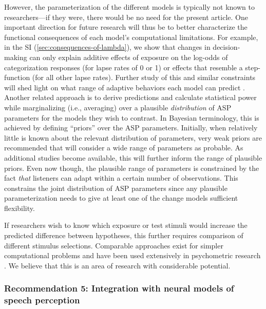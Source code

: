 \documentclass[
  11pt,
  man,floatsintext]{apa6}
\begin{document}
However, the parameterization of the different models is typically not known to researchers---if they were, there would be no need for the present article. One important direction for future research will thus be to better characterize the functional consequences of each model's computational limitations. For example, in the SI (\ref{sec:consequences-of-lambda}), we show that changes in decision-making can only explain additive effects of exposure on the log-odds of categorization responses (for lapse rates of 0 or 1) or effects that resemble a step-function (for all other lapse rates). Further study of this and similar constraints will shed light on what range of adaptive behaviors each model can predict \autocites[for discussions of global, qualitative model comparisons, see][]{pitt2006,apfelbaum-mcmurray2015}. Another related approach is to derive predictions and calculate statistical power while marginalizing (i.e., averaging) over a plausible \emph{distribution} of ASP parameters for the models they wish to contrast. In Bayesian terminology, this is achieved by defining ``priors'' over the ASP parameters. Initially, when relatively little is known about the relevant distribution of parameters, very weak priors are recommended that will consider a wide range of parameters as probable. As additional studies become available, this will further inform the range of plausible priors. Even now though, the plausible range of parameters is constrained by the fact \emph{that} listeners can adapt within a certain number of observations. This constrains the joint distribution of ASP parameters since any plausible parameterization needs to give at least one of the change models sufficient flexibility.

If researchers wish to know which exposure or test stimuli would increase the predicted difference between hypotheses, this further requires comparison of different stimulus selections. Comparable approaches exist for simpler computational problems and have been used extensively in psychometric research \autocites[incl.~online stimulus selection during the experiment, depending on subject-specific performance, e.g.,][]{vul2011,prins2013}. We believe that this is an area of research with considerable potential.

\subsubsection{Recommendation 5: Integration with neural models of speech perception}\label{recommendation-5-integration-with-neural-models-of-speech-perception}
\end{document}
